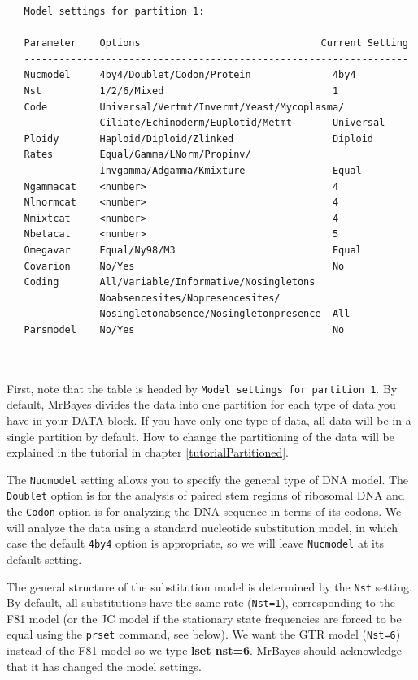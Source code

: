 \documentclass[12pt]{book}
\begin{document}
\begin{singlespacing}
\small
\begin{verbatim}
   Model settings for partition 1:

   Parameter    Options                               Current Setting
   ------------------------------------------------------------------
   Nucmodel     4by4/Doublet/Codon/Protein              4by4
   Nst          1/2/6/Mixed                             1
   Code         Universal/Vertmt/Invermt/Yeast/Mycoplasma/
                Ciliate/Echinoderm/Euplotid/Metmt       Universal
   Ploidy       Haploid/Diploid/Zlinked                 Diploid
   Rates        Equal/Gamma/LNorm/Propinv/
                Invgamma/Adgamma/Kmixture               Equal
   Ngammacat    <number>                                4
   Nlnormcat    <number>                                4
   Nmixtcat     <number>                                4
   Nbetacat     <number>                                5
   Omegavar     Equal/Ny98/M3                           Equal
   Covarion     No/Yes                                  No
   Coding       All/Variable/Informative/Nosingletons
                Noabsencesites/Nopresencesites/
                Nosingletonabsence/Nosingletonpresence  All
   Parsmodel    No/Yes                                  No

   ------------------------------------------------------------------
\end{verbatim}
\normalsize
\end{singlespacing}

First, note that the table is headed by \texttt{Model settings for partition 1}. By default,
MrBayes divides the data into one partition for each type of data you have in your DATA block. If
you have only one type of data, all data will be in a single partition by default. How to change
the partitioning of the data will be explained in the tutorial in chapter
\ref{tutorialPartitioned}.

The \texttt{Nucmodel} setting allows you to specify the general type of DNA model. The
\texttt{Doublet} option is for the analysis of paired stem regions of ribosomal DNA and the
\texttt{Codon} option is for analyzing the DNA sequence in terms of its codons. We will analyze the
data using a standard nucleotide substitution model, in which case the default \texttt{4by4} option
is appropriate, so we will leave \texttt{Nucmodel} at its default setting.

The general structure of the substitution model is determined by the \texttt{Nst} setting. By
default, all substitutions have the same rate (\texttt{Nst=1}), corresponding to the F81 model (or
the JC model if the stationary state frequencies are forced to be equal using the \texttt{prset}
command, see below). We want the GTR model (\texttt{Nst=6}) instead of the F81 model so we type
\textbf{lset nst=6}. MrBayes should acknowledge that it has changed the model settings.
\end{document}
